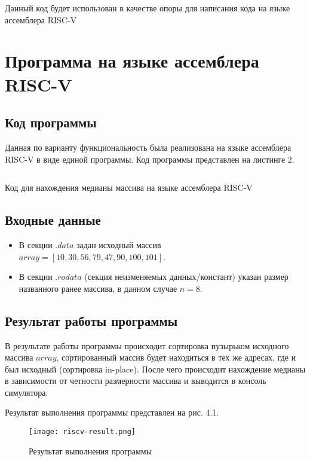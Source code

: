 Данный код будет использован в качестве опоры для написания кода на языке ассемблера RISC-V

\section{Программа на языке ассемблера RISC-V}

\subsection{Код программы}
Данная по варианту функциональность была реализована на языке ассемблера RISC-V в виде единой программы. Код программы представлен на листинге 2.

\begin{code}
	\inputminted[breaklines=true, xleftmargin=1em, linenos, frame=single, framesep=10pt, fontsize=\footnotesize, firstline=1]{asm}{listings/full/median_full.s}
	\caption{Код для нахождения медианы массива на языке ассемблера RISC-V}
\end{code}

\subsection{Входные данные}

\begin{itemize}
	\item В секции \(.data\) задан исходный массив \(array = [10, 30, 56, 79, 47, 90, 100, 101]\).
	\item В секции \(.rodata\) (секция неизменяемых данных/констант) указан размер названного ранее массива, в данном случае \(n = 8\).
\end{itemize}

\subsection{Результат работы программы}
В результате работы программы происходит сортировка пузырьком исходного массива \(array\), сортированный массив будет находиться в тех же адресах, где и был исходный (сортировка in-place). После чего происходит нахождение медианы в зависимости от четности размерности массива и выводится в консоль симулятора.

Результат выполнения программы представлен на рис. 4.1.

\begin{figure}[H]
	\centering
	\texttt{[image: riscv-result.png]}
	\caption{Результат выполнения программы}
\end{figure}

